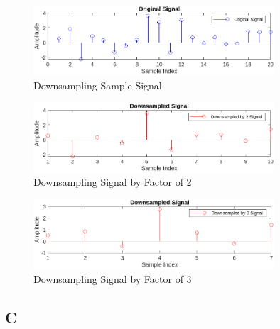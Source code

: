 \documentclass[a4paper,12pt]{article}
\begin{document}
\begin{figure}[h!]
    \centering
    \includegraphics[width=0.8\textwidth]{figs/og_down.png}
    \caption{Downsampling Sample Signal}
    \label{fig:downsampling_original}
\end{figure}

\begin{figure}[h!]
    \centering
    \includegraphics[width=0.8\textwidth]{figs/2_down.png}
    \caption{Downsampling Signal by Factor of 2}
    \label{fig:downsampling_2}
\end{figure}

\begin{figure}[h!]
    \centering
    \includegraphics[width=0.8\textwidth]{figs/3_down.png}
    \caption{Downsampling Signal by Factor of 3}
    \label{fig:downsampling_3}
\end{figure}


\newpage

\subsection{C}
\end{document}
